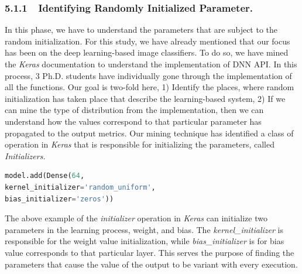 \subsubsection{5.1.1~~Identifying Randomly Initialized Parameter.}
In this phase, we have to understand the parameters that are subject to the random initialization. For this study, we have already mentioned that our focus has been on the deep learning-based image classifiers. To do so, we have mined the \emph{Keras} documentation to understand the implementation of DNN API. In this process, 3 Ph.D. students have individually gone through the implementation of all the functions. Our goal is two-fold here, 1) Identify the places, where random initialization has taken place that describe the learning-based system, 2) If we can mine the type of distribution from the implementation, then we can understand how the values correspond to that particular parameter has propagated to the output metrics. Our mining technique has identified a class of operation in \emph{Keras} that is responsible for initializing the parameters, called \emph{Initializers.} 
\begin{lstlisting}[language=Python, caption=Example of initialization parameters in Keras]
model.add(Dense(64,
kernel_initializer='random_uniform',
bias_initializer='zeros'))
\end{lstlisting}
The above example of the \emph{initializer} operation in \emph{Keras} can initialize two parameters in the learning process, weight, and bias. The \emph{kernel\_initializer} is responsible for the weight value initialization, while \emph{bias\_initializer} is for bias value corresponds to that particular layer. This serves the purpose of finding the parameters that cause the value of the output to be variant with every execution. 

